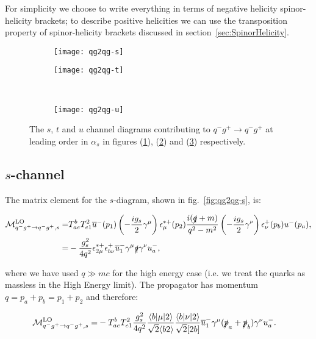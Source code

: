 		For simplicity we choose to write everything in terms of negative helicity spinor-helicity brackets;
		to describe positive helicities we can use the transposition property of spinor-helicity brackets discussed
		in section~\ref{sec:SpinorHelicity}.

		\begin{figure}[h]
			\centering
			\begin{subfigure}[b]{0.3\textwidth}
				\texttt{[image: qg2qg-s]}
				\caption{}
				\label{fig:qg2qg-s}
			\end{subfigure}

			\begin{subfigure}[b]{0.3\textwidth}
				\texttt{[image: qg2qg-t]}
				\caption{}
				\label{fig:qg2qg-t}
			\end{subfigure}
			~
			\begin{subfigure}[b]{0.3\textwidth}
				\texttt{[image: qg2qg-u]}
				\caption{}
				\label{fig:qg2qg-u}
			\end{subfigure}
			\caption{The $s$, $t$ and $u$ channel diagrams contributing to $q^-g^+\to q^-g^+$ at leading
			         order in $\alpha_s$ in figures (\ref{fig:qg2qg-s}), (\ref{fig:qg2qg-t}) and (\ref{fig:qg2qg-u})
			         respectively.}
			\label{fig:TwoToTwo2}
		\end{figure}

		\subsection{$s$-channel}

			The matrix element for the $s$-diagram, shown in fig.~\eqref{fig:qg2qg-s}, is:

			\begin{align}
				\mathcal{M}_{q^-g^+\to q^-g^+, s}^{\text{LO}}=&T^b_{ae}T^2_{e1}\overline{u}^-(p_1)\left(-\frac{ig_s}{2}\gamma^\mu\right)\epsilon_\mu^{*+}(p_2)
					\frac{i(\slashed q+m)}{q^2-m^2}\left(-\frac{ig_s}{2}\gamma^\nu\right)\epsilon^+_\nu(p_b)u^-(p_a), \\
				=&-\frac{g^2_s}{4q^2}\epsilon^{*+}_{2\mu}\epsilon^+_{b\nu}\overline{u}^-_1\gamma^\mu\slashed q\gamma^\nu u^-_a,
			\end{align}

			where we have used $q\gg mc$ for the high energy case (i.e. we treat the quarks as massless in the High Energy limit).
			The propagator has momentum $q=p_a+p_b=p_1+p_2$ and therefore:

			\begin{align}
				\mathcal{M}_{q^-g^+\to q^-g^+, s}^{\text{LO}}=&-T^b_{ae}T^2_{e1}\frac{g^2_s}{4q^2}\frac{\langle{b}|\mu|2\rangle}{\sqrt{2}\langle{b2\rangle}}
				\frac{\langle{b}|\nu|2\rangle}{\sqrt{2}[2b]}\overline{u}^-_1\gamma^\mu(\slashed{p}_a+\slashed{p}_b)\gamma^\nu u^-_a.
			\end{align}

